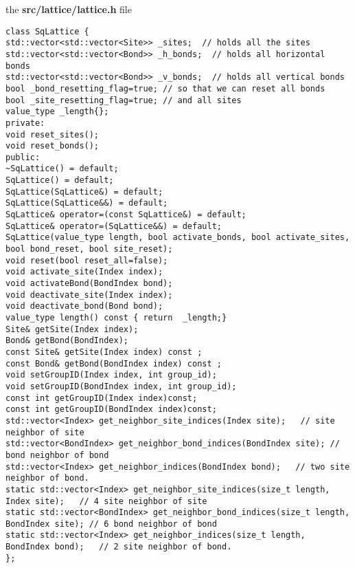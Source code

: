 
the \textbf{src/lattice/lattice.h} file
\begin{lstlisting}[style=CStyle]
class SqLattice {
std::vector<std::vector<Site>> _sites;  // holds all the sites
std::vector<std::vector<Bond>> _h_bonds;  // holds all horizontal bonds
std::vector<std::vector<Bond>> _v_bonds;  // holds all vertical bonds
bool _bond_resetting_flag=true; // so that we can reset all bonds
bool _site_resetting_flag=true; // and all sites
value_type _length{};
private:
void reset_sites();
void reset_bonds();
public:
~SqLattice() = default;
SqLattice() = default;
SqLattice(SqLattice&) = default;
SqLattice(SqLattice&&) = default;
SqLattice& operator=(const SqLattice&) = default;
SqLattice& operator=(SqLattice&&) = default;
SqLattice(value_type length, bool activate_bonds, bool activate_sites, bool bond_reset, bool site_reset);
void reset(bool reset_all=false);
void activate_site(Index index);
void activateBond(BondIndex bond);
void deactivate_site(Index index);
void deactivate_bond(Bond bond);
value_type length() const { return  _length;}
Site& getSite(Index index);
Bond& getBond(BondIndex);
const Site& getSite(Index index) const ;
const Bond& getBond(BondIndex index) const ;
void setGroupID(Index index, int group_id);
void setGroupID(BondIndex index, int group_id);
const int getGroupID(Index index)const;
const int getGroupID(BondIndex index)const;
std::vector<Index> get_neighbor_site_indices(Index site);   // site neighbor of site
std::vector<BondIndex> get_neighbor_bond_indices(BondIndex site); // bond neighbor of bond
std::vector<Index> get_neighbor_indices(BondIndex bond);   // two site neighbor of bond.
static std::vector<Index> get_neighbor_site_indices(size_t length, Index site);   // 4 site neighbor of site
static std::vector<BondIndex> get_neighbor_bond_indices(size_t length, BondIndex site); // 6 bond neighbor of bond
static std::vector<Index> get_neighbor_indices(size_t length, BondIndex bond);   // 2 site neighbor of bond.
};
\end{lstlisting}



